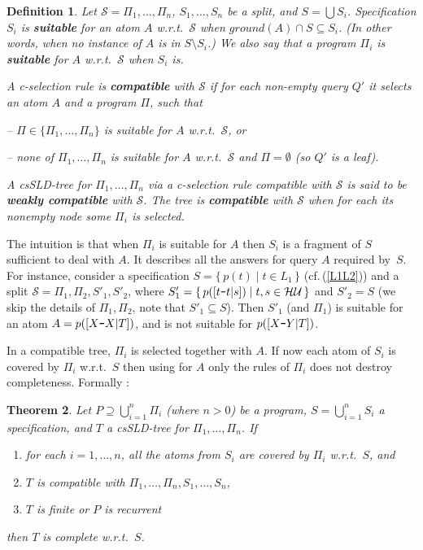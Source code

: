 \documentclass{tlp}
\newtheorem{theorem}{Theorem}
\newtheorem{definition}[theorem]{Definition}
\newcommand*{\seq}[2][n]  {{#2_{1}, \allowbreak \ldots, \allowbreak #2_{#1}}}
\newcommand*{\mydash}{{\mbox{\tt-}}}
\newcommand*{\HU}{{\ensuremath{\cal{H U}}}\xspace}
\renewcommand*{\S}{{\ensuremath{\mathscr S}}\xspace}
\begin{document}
\begin{definition}
\label{def:suitable}
Let  $\S =\seq {\Pi}$, $\seq S$ be a split, and $S=\bigcup S_i$.
Specification $S_i$ is {\bf suitable} for an atom $A$
w.r.t.\ \S
when $ground(A)\cap S \subseteq S_i$.
(In other words, when no instance of $A$ is in $S\setminus S_i$.)
We also say that a program $\Pi_i$ is {\bf suitable} for $A$ w.r.t.\ \S
when $S_i$ is.


A c-selection rule is {\bf compatible} with \S if for each non-empty query
$Q'$ it selects an atom $A$
and a program $\Pi$, such that 

\quad
-- $\Pi\in\{\seq\Pi\}$ is suitable for $A$ w.r.t.\ \S, or

\quad
-- none of $\seq\Pi$ is suitable for $A$ w.r.t.\ \S and  $\Pi=\emptyset$
(so $Q'$ is a leaf).






A csSLD-tree for $\seq {\Pi}$ via a c-selection rule compatible with \S
is said to be {\bf weakly compatible} with \S.
The tree is {\bf compatible} with \S when 
for each its nonempty node some $\Pi_i$ is selected.
\end{definition}

  The intuition is that 
  when $\Pi_i$ is suitable for $A$
  then $S_i$ is a fragment of $S$ sufficient to deal with $A$.
  It describes all the answers for query $A$ required by~$S$.
For instance, consider a specification  
$S = \{\, p(t)\mid t\in L_1\,\}$ (cf.\,(\ref{L1L2}))
and a split $\S = \Pi_1,\Pi_2,S'_1,S'_2$,
where $S'_1 = \{\,p([t\mydash t|s]) \mid t,s\in\HU \,\}$ and $S'_2=S$
(we skip the details of $\Pi_1,\Pi_2$, note that $S'_1\subseteq S$).
Then $S'_1$ (and $\Pi_1$) is suitable for an atom $A = p( [X\mydash X|T])$,
and is not suitable for $p( [X\mydash Y|T])$.

In a compatible tree, $\Pi_i$ is selected together with $A$.
If now each atom of $S_i$ is covered by  $\Pi_i$ w.r.t.\ $S$ then using for
$A$ only the rules of $\Pi_i$ does not destroy completeness.
Formally \cite{drabent.tocl16}:



\vspace{0pt plus 5pt}
\pagebreak[3]
\begin{theorem}
\nopagebreak
\label{th:completeness:pruned}Let $P\supseteq\bigcup_{i=1}^n\Pi_i$ (where $n>0$) be a program, 
    $S=\bigcup_{i=1}^n S_i$ a specification, and 
$T\!$ a csSLD-tree for $\seq\Pi$.
    If
\begin{enumerate}[\qquad]
    \item 
    \label{prop:cssld.complete.cond0}
        for each $i=1,\ldots,n$, 
        all the atoms from $S_i$ are covered by $\Pi_i$ w.r.t.\ $S$, and 
    \item
    \label{prop:cssld.complete.cond1}
        $T$ is compatible with $\seq\Pi,\seq S$,
    \item 
    \label{prop:cssld.complete.cond2}
$T$ is finite or
         $P$ is recurrent  

\end{enumerate}
    then $T$ is complete w.r.t.\ $S$.
\end{theorem}
\end{document}
